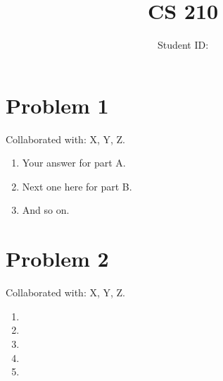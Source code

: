 \documentclass{article}
\title{CS 210 \hwNo}
\author{\myname \qquad Student ID: \myid}
\date{\currentdate}
\begin{document}
\maketitle

\section*{Problem 1}
Collaborated with: X, Y, Z.
\begin{enumerate}
    \item %
    Your answer for part A.
    
    \item %
    Next one here for part B.
    
    \item %
    And so on.

\end{enumerate}

\section*{Problem 2}
Collaborated with: X, Y, Z.
\begin{enumerate}
    \item %
    
    \item %
    
    \item %
    
    \item %
    
    \item %

\end{enumerate}
\end{document}

